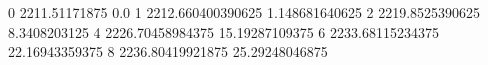 0 2211.51171875 0.0
1 2212.660400390625 1.148681640625
2 2219.8525390625 8.3408203125
4 2226.70458984375 15.19287109375
6 2233.68115234375 22.16943359375
8 2236.80419921875 25.29248046875
